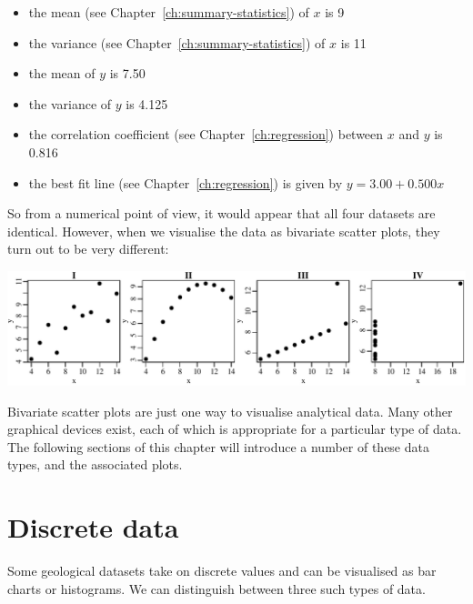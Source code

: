 \begin{itemize}\label{pg:anscombe}
\item the mean (see Chapter~\ref{ch:summary-statistics}) of $x$ is 9
\item the variance (see Chapter~\ref{ch:summary-statistics}) of $x$ is 11
\item the mean of $y$ is 7.50
\item the variance of $y$ is 4.125
\item the correlation coefficient (see Chapter~\ref{ch:regression})
  between $x$ and $y$ is 0.816
\item the best fit line (see Chapter~\ref{ch:regression}) is given by $y =
  3.00 + 0.500 x$
\end{itemize}

So from a numerical point of view, it would appear that all four
datasets are identical. However, when we visualise the data as
bivariate scatter plots, they turn out to be very different:\medskip

\noindent\includegraphics[width=\textwidth]{../figures/anscombe.pdf}
\begingroup
{}\label{fig:anscombe}
\endgroup

Bivariate scatter plots are just one way to visualise analytical data.
Many other graphical devices exist, each of which is appropriate for a
particular type of data. The following sections of this chapter will
introduce a number of these data types, and the associated plots.

\section{Discrete data}
\label{sec:discrete}

Some geological datasets take on discrete values and can be visualised
as bar charts or histograms. We can distinguish between three such
types of data.

